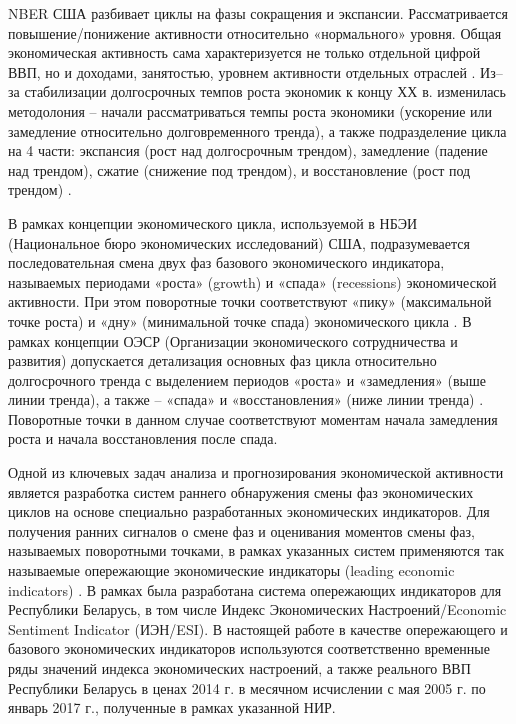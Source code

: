 \documentclass[../report.tex]{subfiles}
\begin{document}
	NBER США разбивает циклы на фазы сокращения и экспансии. Рассматривается повышение/понижение активности относительно «нормального» уровня. Общая экономическая активность сама характеризуется не только отдельной цифрой ВВП, но и доходами, занятостью, уровнем активности отдельных отраслей \cite{nberDevelopment}. Из–за стабилизации долгосрочных темпов роста экономик к концу ХХ в. изменилась методолония – начали рассматриваться темпы роста экономики (ускорение или замедление относительно долговременного тренда), а также подразделение цикла на 4 части: экспансия (рост над долгосрочным трендом), замедление (падение над трендом), сжатие (снижение под трендом), и восстановление (рост под трендом) \cite{oecdCLI}.
	\fi
	
	\iffalse
	Unused material
	
	Предполагается, что поворотные точки опережающих индикаторов предшествуют поворотным точкам некоторого базового экономического индикатора (например, реального ВВП), характеризующего состояние экономики в целом. В настоящее время существуют два основных методологических центра по разработке подобных индикаторов:   Национальное бюро экономических исследований (НБЭИ) США  (National Bureau of Economic Research – NBER) и Статистический  департамент Организации экономического сотрудничества и развития (ОЭСР) (Organization for Economic Cooperation and Development – OECD). 
	\fi
	
	В рамках концепции экономического цикла, используемой в НБЭИ (Национальное бюро экономических исследований) США, подразумевается последовательная смена двух фаз базового экономического индикатора, называемых периодами «роста» (growth)  и «спада» (recessions) экономической активности. При этом поворотные точки соответствуют «пику» (максимальной точке роста) и «дну» (минимальной точке спада) экономического цикла \cite{nberDevelopment}.  В рамках концепции ОЭСР (Организации экономического сотрудничества и развития) допускается  детализация основных фаз цикла относительно долгосрочного тренда с выделением периодов «роста» и «замедления» (выше линии тренда), а также  – «спада» и «восстановления»  (ниже линии тренда) \cite{oecdCycleExtraction}. Поворотные точки в данном случае соответствуют моментам начала замедления роста и начала восстановления после спада. 
	
	Одной из ключевых задач анализа и прогнозирования экономической активности является разработка систем раннего обнаружения смены фаз экономических циклов на основе специально разработанных экономических индикаторов. Для получения ранних сигналов о смене фаз и оценивания моментов смены фаз, называемых поворотными точками, в рамках указанных систем применяются так называемые опережающие экономические индикаторы (leading economic indicators) \cite{oecdCLI}. В рамках \cite{esiMaking,esiExtra} была разработана система опережающих индикаторов для Республики Беларусь, в том числе Индекс Экономических Настроений/Economic Sentiment Indicator (ИЭН/ESI). В настоящей работе в качестве опережающего и базового экономических индикаторов используются соответственно временные ряды значений индекса экономических настроений, а также реального ВВП Республики Беларусь в ценах 2014 г. в месячном исчислении с мая 2005 г. по январь 2017 г., полученные в рамках указанной НИР.
	
\end{document}
